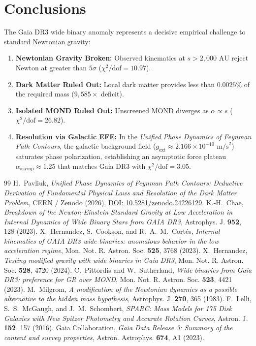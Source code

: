 \documentclass[11pt,a4paper]{article}
\begin{document}
\section{Conclusions}
The Gaia DR3 wide binary anomaly represents a decisive empirical challenge to standard Newtonian gravity:
\begin{enumerate}
    \item \textbf{Newtonian Gravity Broken:} Observed kinematics at $s > 2,000\text{ AU}$ reject Newton at greater than $5\sigma$ ($\chi^2/\mathrm{dof} = 10.97$).
    \item \textbf{Dark Matter Ruled Out:} Local dark matter provides less than $0.0025\%$ of the required mass ($9,585\times$ deficit).
    \item \textbf{Isolated MOND Ruled Out:} Unscreened MOND diverges as $\alpha \propto s$ ($\chi^2/\mathrm{dof} = 26.82$).
    \item \textbf{Resolution via Galactic EFE:} In the \textit{Unified Phase Dynamics of Feynman Path Contours}, the galactic background field ($g_{\mathrm{ext}} \approx 2.166 \times 10^{-10}\text{ m/s}^2$) saturates phase polarization, establishing an asymptotic force plateau $\alpha_{\mathrm{asymp}} \approx 1.25$ that matches Gaia DR3 with $\chi^2/\mathrm{dof} = 3.05$.
\end{enumerate}

\begin{thebibliography}{99}
 H.~Pavliuk, \textit{Unified Phase Dynamics of Feynman Path Contours: Deductive Derivation of Fundamental Physical Laws and Resolution of the Dark Matter Problem}, CERN / Zenodo (2026), \href{https://doi.org/10.5281/zenodo.24226129}{DOI: 10.5281/zenodo.24226129}.
 K.-H.~Chae, \textit{Breakdown of the Newton-Einstein Standard Gravity at Low Acceleration in Internal Dynamics of Wide Binary Stars from GAIA DR3}, Astrophys. J. \textbf{952}, 128 (2023).
 X.~Hernandez, S.~Cookson, and R.~A.~M.~Cortés, \textit{Internal kinematics of GAIA DR3 wide binaries: anomalous behavior in the low acceleration regime}, Mon. Not. R. Astron. Soc. \textbf{525}, 3768 (2023).
 X.~Hernandez, \textit{Testing modified gravity with wide binaries in Gaia DR3}, Mon. Not. R. Astron. Soc. \textbf{528}, 4720 (2024).
 C.~Pittordis and W.~Sutherland, \textit{Wide binaries from Gaia DR3: preference for GR over MOND}, Mon. Not. R. Astron. Soc. \textbf{523}, 4421 (2023).
 M.~Milgrom, \textit{A modification of the Newtonian dynamics as a possible alternative to the hidden mass hypothesis}, Astrophys. J. \textbf{270}, 365 (1983).
 F.~Lelli, S.~S.~McGaugh, and J.~M.~Schombert, \textit{SPARC: Mass Models for 175 Disk Galaxies with New Spitzer Photometry and Accurate Rotation Curves}, Astron. J. \textbf{152}, 157 (2016).
 Gaia Collaboration, \textit{Gaia Data Release 3: Summary of the content and survey properties}, Astron. Astrophys. \textbf{674}, A1 (2023).
\end{thebibliography}
\end{document}
